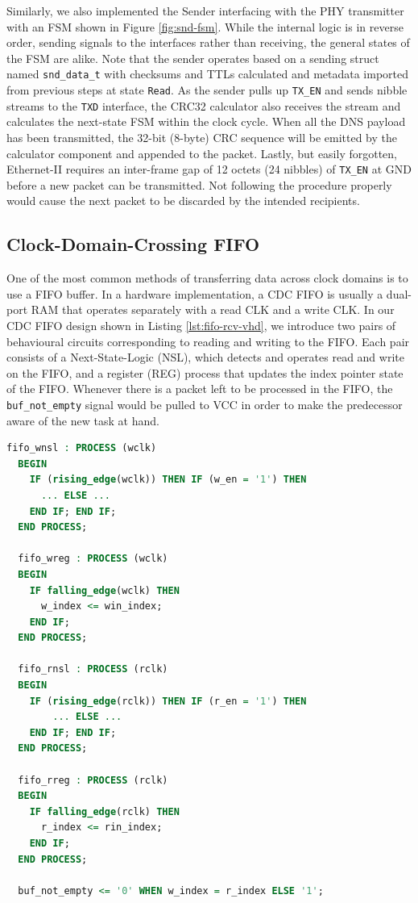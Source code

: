 \documentclass[a4paper]{report}
\newcommand{\code}{\texttt}
\begin{document}
Similarly, we also implemented the Sender interfacing with the PHY transmitter with an FSM shown in Figure \ref{fig:snd-fsm}. While the internal logic is in reverse order, sending signals to the interfaces rather than receiving, the general states of the FSM are alike. Note that the sender operates based on a sending struct named \code{snd\_data\_t} with checksums and TTLs calculated and metadata imported from previous steps at state \code{Read}. As the sender pulls up \code{TX\_EN} and sends nibble streams to the \code{TXD} interface, the CRC32 calculator also receives the stream and calculates the next-state FSM within the clock cycle. When all the DNS payload has been transmitted, the 32-bit (8-byte) CRC sequence will be emitted by the calculator component and appended to the packet. Lastly, but easily forgotten, Ethernet-II requires an inter-frame gap of 12 octets (24 nibbles) of \code{TX\_EN} at GND before a new packet can be transmitted. Not following the procedure properly would cause the next packet to be discarded by the intended recipients.

\subsection{Clock-Domain-Crossing FIFO}

One of the most common methods of transferring data across clock domains is to use a FIFO buffer. In a hardware implementation, a CDC FIFO is usually a dual-port RAM that operates separately with a read CLK and a write CLK. In our CDC FIFO design shown in Listing \ref{lst:fifo-rcv-vhd}, we introduce two pairs of behavioural circuits corresponding to reading and writing to the FIFO. Each pair consists of a Next-State-Logic (NSL), which detects and operates read and write on the FIFO, and a register (REG) process that updates the index pointer state of the FIFO. Whenever there is a packet left to be processed in the FIFO, the \code{buf\_not\_empty} signal would be pulled to VCC in order to make the predecessor aware of the new task at hand.

\begin{lstlisting}[language=VHDL, caption=Snippet of FIFO \code{FIFO\_receive.vhd}, label={lst:fifo-rcv-vhd}]
  fifo_wnsl : PROCESS (wclk)
  BEGIN
    IF (rising_edge(wclk)) THEN IF (w_en = '1') THEN
      ... ELSE ...
    END IF; END IF;
  END PROCESS;

  fifo_wreg : PROCESS (wclk)
  BEGIN
    IF falling_edge(wclk) THEN
      w_index <= win_index;
    END IF;
  END PROCESS;

  fifo_rnsl : PROCESS (rclk)
  BEGIN
    IF (rising_edge(rclk)) THEN IF (r_en = '1') THEN
        ... ELSE ...
    END IF; END IF;
  END PROCESS;

  fifo_rreg : PROCESS (rclk)
  BEGIN
    IF falling_edge(rclk) THEN
      r_index <= rin_index;
    END IF;
  END PROCESS;

  buf_not_empty <= '0' WHEN w_index = r_index ELSE '1';
\end{lstlisting}
\end{document}
